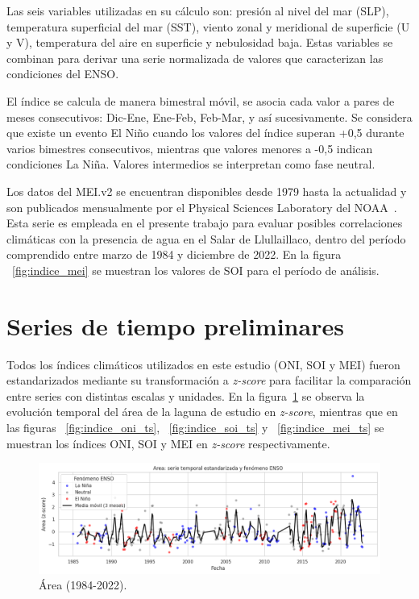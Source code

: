 Las seis variables utilizadas en su cálculo son: presión al nivel del mar (SLP), temperatura superficial del mar (SST), viento zonal y meridional de superficie (U y V), temperatura del aire en superficie y nebulosidad baja. Estas variables se combinan para derivar una serie normalizada de valores que caracterizan las condiciones del ENSO.

El índice se calcula de manera bimestral móvil, se asocia cada valor a pares de meses consecutivos: Dic-Ene, Ene-Feb, Feb-Mar, y así sucesivamente. Se considera que existe un evento El Niño cuando los valores del índice superan +0{,}5 durante varios bimestres consecutivos, mientras que valores menores a -0{,}5 indican condiciones La Niña. Valores intermedios se interpretan como fase neutral.

Los datos del MEI.v2 se encuentran disponibles desde 1979 hasta la actualidad y son publicados mensualmente por el Physical Sciences Laboratory del NOAA~\cite{meiindex}. Esta serie es empleada en el presente trabajo para evaluar posibles correlaciones climáticas con la presencia de agua en el Salar de Llullaillaco, dentro del período comprendido entre marzo de 1984 y diciembre de 2022. En la figura ~\ref{fig:indice_mei} se muestran los valores de SOI para el período de análisis. 



\section{Series de tiempo preliminares}

Todos los índices climáticos utilizados en este estudio (ONI, SOI y MEI) fueron estandarizados mediante su transformación a \textit{z-score} para facilitar la comparación entre series con distintas escalas y unidades. En la figura~\ref{fig:indice_area} se observa la evolución temporal del área de la laguna de estudio en \textit{z-score}, mientras que en las figuras ~\ref{fig:indice_oni_ts}, ~\ref{fig:indice_soi_ts} y ~\ref{fig:indice_mei_ts} se muestran los índices ONI, SOI y MEI en \textit{z-score} respectivamente.

\begin{figure}[ht]
        \centering
        \includegraphics[scale=.45]
        {Figures/fig16_ts_area.png}
        \caption{Área (1984-2022).}
        \label{fig:indice_area}
\end{figure}



